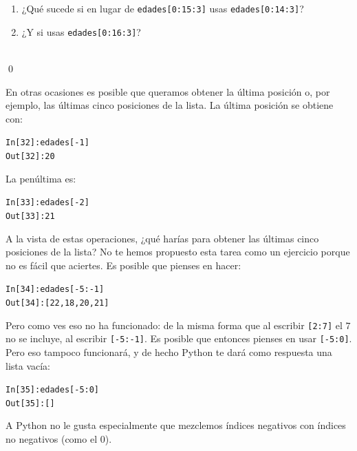 \documentclass[10pt,a4paper]{article}\usepackage[]{graphicx}\usepackage[]{color}
\makeatletter
\newcommand{\hlnum}[1]{\textcolor[rgb]{0.686,0.059,0.569}{#1}}%
\newcommand{\hlopt}[1]{\textcolor[rgb]{0,0,0}{#1}}%
\newcommand{\hlstd}[1]{\textcolor[rgb]{0.345,0.345,0.345}{#1}}%
\newenvironment{kframe}{%
 \def\at@end@of@kframe{}%
 \ifinner\ifhmode%
  \def\at@end@of@kframe{\end{minipage}}%
  \begin{minipage}{\columnwidth}%
 \fi\fi%
 \def\FrameCommand##1{\hskip\@totalleftmargin \hskip-\fboxsep
 \colorbox{shadecolor}{##1}\hskip-\fboxsep
     \hskip-\linewidth \hskip-\@totalleftmargin \hskip\columnwidth}%
 \MakeFramed {\advance\hsize-\width
   \@totalleftmargin\z@ \linewidth\hsize
   \@setminipage}}%
 {\par\unskip\endMakeFramed%
 \at@end@of@kframe}
\newenvironment{knitrout}{}{} %
\makeatother
\begin{document}
\begin{ejercicio}
\label{tut02:ejercicio12}
\quad
\begin{enumerate}
\item ¿Qué sucede si en lugar de {\tt edades[0:15:3]} usas {\tt edades[0:14:3]}?
\item ¿Y si usas {\tt edades[0:16:3]}?
\end{enumerate}
\quad\\
\qed
\end{ejercicio}

En otras ocasiones es posible que queramos obtener la última posición o, por ejemplo, las últimas cinco posiciones de la lista. La última posición se obtiene con:
\begin{knitrout}
\color{fgcolor}\begin{kframe}
\begin{alltt}
\hlstd{In [}\hlnum{32}\hlstd{]}\hlopt{:} \hlstd{edades[}\hlopt{-}\hlnum{1}\hlstd{]}
\hlstd{Out[}\hlnum{32}\hlstd{]}\hlopt{:} \hlnum{20}
\end{alltt}
\end{kframe}
\end{knitrout}
La penúltima es:
\begin{knitrout}
\color{fgcolor}\begin{kframe}
\begin{alltt}
\hlstd{In [}\hlnum{33}\hlstd{]}\hlopt{:} \hlstd{edades[}\hlopt{-}\hlnum{2}\hlstd{]}
\hlstd{Out[}\hlnum{33}\hlstd{]}\hlopt{:} \hlnum{21}
\end{alltt}
\end{kframe}
\end{knitrout}

A la vista de estas operaciones, ¿qué harías para obtener las últimas cinco posiciones de la lista? No te hemos propuesto esta tarea como un ejercicio porque no es fácil que aciertes. Es posible que pienses en hacer:
\begin{knitrout}
\color{fgcolor}\begin{kframe}
\begin{alltt}
In [34]: edades[-5:-1]
Out[34]: [22, 18, 20, 21]
\end{alltt}
\end{kframe}
\end{knitrout}
Pero como ves eso no ha funcionado: de la misma forma que al escribir {\tt [2:7]} el $7$ no se incluye, al escribir {\tt [-5:-1]}. Es posible que entonces pienses en usar {\tt [-5:0]}. Pero eso tampoco funcionará, y de hecho Python te dará como respuesta una lista vacía:
\begin{knitrout}
\color{fgcolor}\begin{kframe}
\begin{alltt}
In [35]: edades[-5:0]
Out[35]: []
\end{alltt}
\end{kframe}
\end{knitrout}
A Python no le gusta especialmente que mezclemos índices negativos con índices no negativos (como el $0$).
\end{document}
